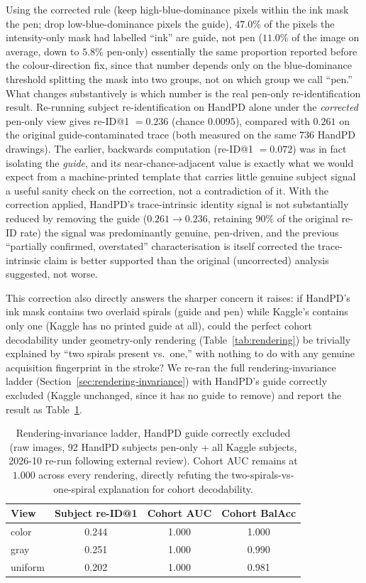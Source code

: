 \documentclass[3p,final,10pt]{elsarticle}
\begin{document}
Using the corrected rule (keep high-blue-dominance pixels within the ink
mask the pen; drop low-blue-dominance pixels the guide), $47.0\%$ of
the pixels the intensity-only mask had labelled ``ink'' are guide, not pen
($11.0\%$ of the image on average, down to $5.8\%$ pen-only) essentially
the same proportion reported before the colour-direction fix, since that
number depends only on the blue-dominance threshold splitting the mask
into two groups, not on which group we call ``pen.'' What changes
substantively is which number is the real pen-only re-identification
result. Re-running subject re-identification on HandPD alone under the
\emph{corrected} pen-only view gives re-ID@1 $=0.236$ (chance $0.0095$),
compared with $0.261$ on the original guide-contaminated trace (both
measured on the same 736 HandPD drawings). The earlier, backwards
computation (re-ID@1 $=0.072$) was in fact isolating the \emph{guide},
and its near-chance-adjacent value is exactly what we would expect from a
machine-printed template that carries little genuine subject signal
a useful sanity check on the correction, not a contradiction of it. With
the correction applied, HandPD's trace-intrinsic identity signal is
not substantially reduced by removing the guide ($0.261\to0.236$,
retaining $90\%$ of the original re-ID rate) the signal was predominantly
genuine, pen-driven, and the previous ``partially confirmed, overstated''
characterisation is itself corrected the trace-intrinsic claim is
better supported than the original (uncorrected) analysis suggested, not
worse.

This correction also directly answers the sharper concern it raises: if
HandPD's ink mask contains two overlaid spirals (guide and pen) while
Kaggle's contains only one (Kaggle has no printed guide at all), could the
perfect cohort decodability under geometry-only rendering
(Table~\ref{tab:rendering}) be trivially explained by ``two spirals
present vs.\ one,'' with nothing to do with any genuine acquisition
fingerprint in the stroke? We re-ran the full rendering-invariance ladder
(Section~\ref{sec:rendering-invariance}) with HandPD's guide correctly
excluded (Kaggle unchanged, since it has no guide to remove) and report
the result as Table~\ref{tab:rendering-penonly}.

\begin{table}[H]
\centering
\caption{Rendering-invariance ladder, HandPD guide correctly excluded
(raw images, 92 HandPD subjects pen-only + all Kaggle subjects, 2026-10
re-run following external review). Cohort AUC remains at $1.000$ across
every rendering, directly refuting the two-spirals-vs-one-spiral
explanation for cohort decodability.}
\label{tab:rendering-penonly}
\begin{tabular}{lccc}
\toprule
View & Subject re-ID@1 & Cohort AUC & Cohort BalAcc \\
\midrule
color   & 0.244 & 1.000 & 1.000 \\
gray    & 0.251 & 1.000 & 0.990 \\
uniform & 0.202 & 1.000 & 0.981 \\
\bottomrule
\end{tabular}
\end{table}
\end{document}
